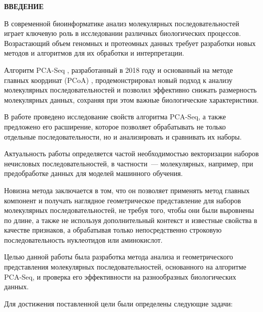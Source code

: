 \newpage

\setcounter{page}{2}

\newpage \renewcommand{\contentsname}{\centerline{\large СОДЕРЖАНИЕ}}
\tableofcontents

\newpage
\begin{center}
  \textbf{\large ВВЕДЕНИЕ}
\end{center}

В современной биоинформатике анализ молекулярных последовательностей играет ключевую роль в исследовании различных биологических процессов. Возрастающий объем геномных и протеомных данных требует разработки новых методов и алгоритмов для их обработки и интерпретации.

Алгоритм PCA-Seq \cite{Efimov2020}, разработанный в 2018 году и основанный на методе главных координат (PCoA) \cite{Gower1966}, продемонстрировал новый подход к анализу молекулярных последовательностей и позволил эффективно снижать размерность молекулярных данных, сохраняя при этом важные биологические характеристики.

В работе проведено исследование свойств алгоритма PCA-Seq, а также предложено его расширение, которое позволяет обрабатывать не только отдельные последовательности, но и анализировать и сравнивать их наборы.

Актуальность работы определяется частой необходимостью векторизации наборов нечисловых последовательностей, в частности~--- молекулярных, например, при предобработке данных для моделей машинного обучения.

Новизна метода заключается в том, что он позволяет применять метод главных компонент и получать наглядное геометрическое представление для наборов молекулярных последовательностей, не требуя того, чтобы они были выровнены по длине, а также не используя дополнительный контекст и известные свойства в качестве признаков, а обрабатывая только непосредственно строковую последовательность нуклеотидов или аминокислот.

Целью данной работы была разработка метода анализа и геометрического представления молекулярных последовательностей, основанного на алгоритме PCA-Seq, и проверка его эффективности на разнообразных биологических данных.

Для достижения поставленной цели были определены следующие задачи:

